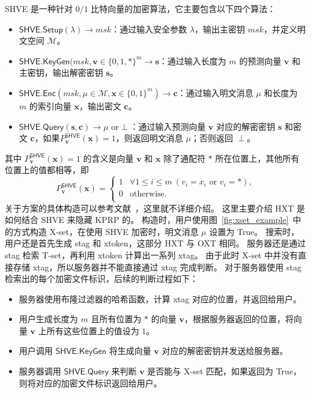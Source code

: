SHVE 是一种针对 $0/1$ 比特向量的加密算法，它主要包含以下四个算法：
\begin{itemize}
  \item $\mathsf{SHVE}.\mathsf{Setup}(\lambda) \to msk$：通过输入安全参数 $\lambda$，输出主密钥 $msk$，并定义明文空间 $\mathcal{M}$。
  \item $\mathsf{SHVE}.\mathsf{KeyGen}(msk, \mathbf{v} \in \{0,1,*\}^m \to \mathbf{s} $：通过输入长度为 $m$ 的预测向量 $\mathbf{v}$ 和主密钥，输出解密密钥 $\mathbf{s}$。
  \item $\mathsf{SHVE}.\mathsf{Enc}(msk, \mu\in \mathcal{M}, \mathbf{x} \in \{0,1\}^m ) \to \mathbf{c}$：通过输入明文消息 $\mu$ 和长度为 $m$ 的索引向量 $\mathbf{x}$，输出密文 $\mathbf{c}$。
  \item $\mathsf{SHVE}.\mathsf{Query}(\mathbf{s}, \mathbf{c}) \to \mu \mbox{ or} \perp$：通过输入预测向量 $\mathbf{v}$ 对应的解密密钥 $\mathbf{s}$ 和密文 $\mathbf{c}$，如果$P_{\mathbf{v}}^{\mathsf{SHVE}}(\mathbf{x}) = 1$，则返回明文消息 $\mu$；否则返回 $\perp$。
\end{itemize}
其中 $P_{\mathbf{v}}^{\mathsf{SHVE}}(\mathbf{x})=1$ 的含义是向量 $\mathbf{v}$ 和 $\mathbf{x}$ 除了通配符 $*$ 所在位置上，其他所有位置上的值都相等，即
\begin{equation}
  P_{\mathbf{v}}^{\mathsf{SHVE}}(\mathbf{x}) = \left\{
  \begin{array}{ll}
  1 & \forall 1\leq i \leq m \  (v_i = x_i \mbox{ or } v_i=*), \\
  0 & \mbox{otherwise}. \\
  \end{array}
  \right.
\end{equation}
关于方案的具体构造可以参考文献~\cite{lai2018result}，这里就不详细介绍。
这里主要介绍 HXT 是如何结合 SHVE 来隐藏 KPRP 的。
构造时，用户使用图~\ref{fig:xset_example}~中的方式构造 X-set，在使用 SHVE 加密时，明文消息 $\mu$ 设置为 True。
搜索时，用户还是首先生成 stag 和 xtoken，这部分 HXT 与 OXT 相同。
服务器还是通过 stag 检索 T-set，再利用 xtoken 计算出一系列 xtag。
由于此时 X-set 中并没有直接存储 xtag，所以服务器并不能直接通过 xtag 完成判断。
对于服务器使用 stag 检索出的每个加密文件标识，后续的判断过程如下：
\begin{itemize}
  \item 服务器使用布隆过滤器的哈希函数，计算 xtag 对应的位置，并返回给用户。
  \item 用户生成长度为 $m$ 且所有位置为 $*$ 的向量 $\mathbf{v}$，根据服务器返回的位置，将向量 $\mathbf{v}$ 上所有这些位置上的值设为 $1$。
  \item 用户调用 $\mathsf{SHVE}.\mathsf{KeyGen}$ 将生成向量 $\mathbf{v}$ 对应的解密密钥并发送给服务器。
  \item 服务器调用 $\mathsf{SHVE}.\mathsf{Query}$ 来判断 $\mathbf{v}$ 是否能与 X-set 匹配，如果返回为 True，则将对应的加密文件标识返回给用户。
\end{itemize}
